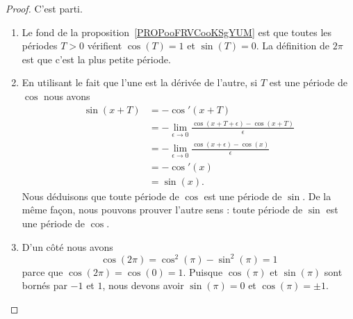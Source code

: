 \begin{proof}
	C'est parti.
	\begin{enumerate}
		\item
		      Le fond de la proposition~\ref{PROPooFRVCooKSgYUM} est que toutes les périodes \( T>0\) vérifient \( \cos(T)=1\) et \( \sin(T)=0\). La définition de \( 2\pi\) est que c'est la plus petite période.
		\item
		      En utilisant le fait que l'une est la dérivée de l'autre, si \( T\) est une période de \( \cos\) nous avons
		      \begin{subequations}
			      \begin{align}
				      \sin(x+T) & =-\cos'(x+T)                                                            \\
				                & =-\lim_{\epsilon\to 0}\frac{ \cos(x+T+\epsilon)-\cos(x+T) }{\epsilon  } \\
				                & =-\lim_{\epsilon\to 0}\frac{ \cos(x+\epsilon)-\cos(x) }{ \epsilon }     \\
				                & =-\cos'(x)                                                              \\
				                & =\sin(x).
			      \end{align}
		      \end{subequations}
		      Nous déduisons que toute période de \( \cos\) est une période de \( \sin\). De la même façon, nous pouvons prouver l'autre sens : toute période de \( \sin\) est une période de \( \cos\).
		\item
		      D'un côté nous avons
		      \begin{equation}
			      \cos(2\pi)=\cos^2(\pi)-\sin^2(\pi)=1
		      \end{equation}
		      parce que \( \cos(2\pi)=\cos(0)=1\). Puisque \( \cos(\pi)\) et \( \sin(\pi)\) sont bornés par \( -1\) et \( 1\), nous devons avoir \( \sin(\pi)=0\) et \( \cos(\pi)=\pm 1\).


\end{enumerate}
\end{proof}
